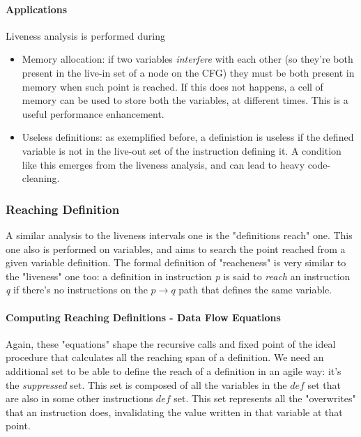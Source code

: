                     \paragraph{Applications}
                        Liveness analysis is performed during
                        \begin{itemize}
                            \item Memory allocation: if two variables \emph{interfere} with each other (so they're both present in the live-in set of a node on the 
							CFG) they must be both present in memory when such point is reached. If this does not happens, a cell of memory can be used to store both 
							the variables, at different times. This is a useful performance enhancement. 
                            \item Useless definitions: as exemplified before, a definistion is useless if the defined variable is not in the live-out set of the 
							instruction defining it. A condition like this emerges from the liveness analysis, and can lead to heavy code-cleaning. 
                        \end{itemize}
                
                \subsubsection{Reaching Definition}
                    A similar analysis to the liveness intervals one is the "definitions reach" one. This one also is performed on variables, and aims to search the 
					point reached from a given variable definition. The formal definition of "reacheness" is very similar to the "liveness" one too: a definition in 
					instruction \emph{p} is said to \emph{reach} an instruction \emph{q} if there's no instructions on the $p \rightarrow q$ path that defines the 
					same variable. 
                    
                    \paragraph{Computing Reaching Definitions - Data Flow Equations}
                        Again, these "equations" shape the recursive calls and fixed point of the ideal procedure that calculates all the reaching span of a 
						definition. We need an additional set to be able to define the reach of a definition in an agile way: it's the \emph{suppressed} set. This 
						set is composed of all the variables in the $def$ set that are also in some other instructions $def$ set. This set represents all the 
						"overwrites" that an instruction does, invalidating the value written in that variable at that point.

